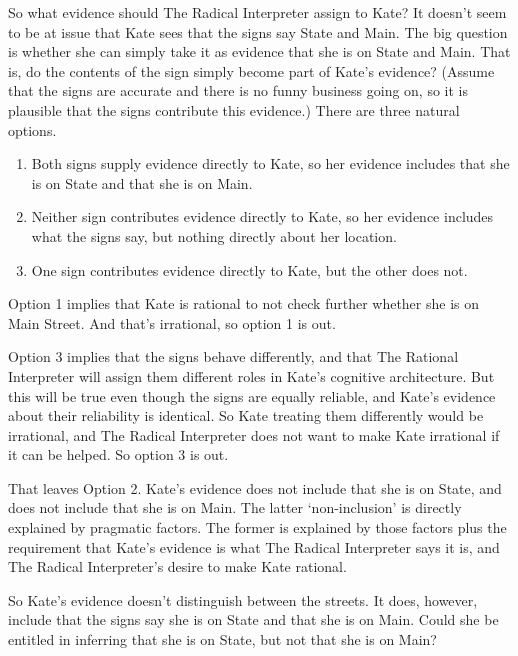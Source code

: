 \documentclass[
  12pt,
  letterpaper,
]{scrbook}
\providecommand{\tightlist}{%
  \setlength{\itemsep}{0pt}\setlength{\parskip}{0pt}}\usepackage{longtable,booktabs,array}
\begin{document}
So what evidence should The Radical Interpreter assign to Kate? It
doesn't seem to be at issue that Kate sees that the signs say State and
Main. The big question is whether she can simply take it as evidence
that she is on State and Main. That is, do the contents of the sign
simply become part of Kate's evidence? (Assume that the signs are
accurate and there is no funny business going on, so it is plausible
that the signs contribute this evidence.) There are three natural
options.

\begin{enumerate}
\def\labelenumi{\arabic{enumi}.}
\tightlist
\item
  Both signs supply evidence directly to Kate, so her evidence includes
  that she is on State and that she is on Main.
\item
  Neither sign contributes evidence directly to Kate, so her evidence
  includes what the signs say, but nothing directly about her location.
\item
  One sign contributes evidence directly to Kate, but the other does
  not.
\end{enumerate}

Option 1 implies that Kate is rational to not check further whether she
is on Main Street. And that's irrational, so option 1 is out.

Option 3 implies that the signs behave differently, and that The
Rational Interpreter will assign them different roles in Kate's
cognitive architecture. But this will be true even though the signs are
equally reliable, and Kate's evidence about their reliability is
identical. So Kate treating them differently would be irrational, and
The Radical Interpreter does not want to make Kate irrational if it can
be helped. So option 3 is out.

That leaves Option 2. Kate's evidence does not include that she is on
State, and does not include that she is on Main. The latter
`non-inclusion' is directly explained by pragmatic factors. The former
is explained by those factors plus the requirement that Kate's evidence
is what The Radical Interpreter says it is, and The Radical
Interpreter's desire to make Kate rational.

So Kate's evidence doesn't distinguish between the streets. It does,
however, include that the signs say she is on State and that she is on
Main. Could she be entitled in inferring that she is on State, but not
that she is on Main?
\end{document}

